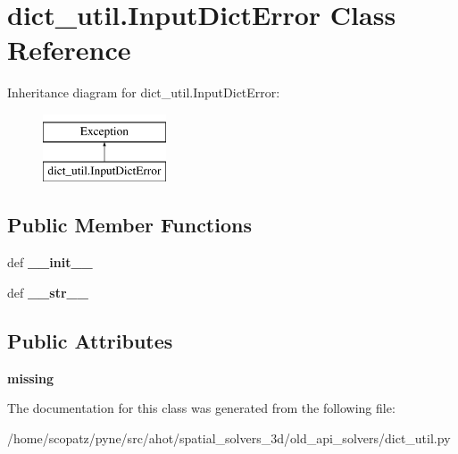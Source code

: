 \hypertarget{classdict__util_1_1_input_dict_error}{\section{dict\-\_\-util.\-Input\-Dict\-Error Class Reference}
\label{classdict__util_1_1_input_dict_error}
}
Inheritance diagram for dict\-\_\-util.\-Input\-Dict\-Error\-:\begin{figure}[H]
\begin{center}
\leavevmode
\includegraphics[height=2.000000cm]{classdict__util_1_1_input_dict_error}
\end{center}
\end{figure}
\subsection*{Public Member Functions}
\begin{DoxyCompactItemize}
\item 
\hypertarget{classdict__util_1_1_input_dict_error_a4e97e96ffaf431264fbaa99f89aa4e36}{def {\bfseries \-\_\-\-\_\-init\-\_\-\-\_\-}}\label{classdict__util_1_1_input_dict_error_a4e97e96ffaf431264fbaa99f89aa4e36}

\item 
\hypertarget{classdict__util_1_1_input_dict_error_a7227b403f5bdaba9ef675cb9cf1111e8}{def {\bfseries \-\_\-\-\_\-str\-\_\-\-\_\-}}\label{classdict__util_1_1_input_dict_error_a7227b403f5bdaba9ef675cb9cf1111e8}

\end{DoxyCompactItemize}
\subsection*{Public Attributes}
\begin{DoxyCompactItemize}
\item 
\hypertarget{classdict__util_1_1_input_dict_error_aa2ebc135b20ddafa9bae59e28bf417f1}{{\bfseries missing}}\label{classdict__util_1_1_input_dict_error_aa2ebc135b20ddafa9bae59e28bf417f1}

\end{DoxyCompactItemize}


The documentation for this class was generated from the following file\-:\begin{DoxyCompactItemize}
\item 
/home/scopatz/pyne/src/ahot/spatial\-\_\-solvers\-\_\-3d/old\-\_\-api\-\_\-solvers/dict\-\_\-util.\-py\end{DoxyCompactItemize}
